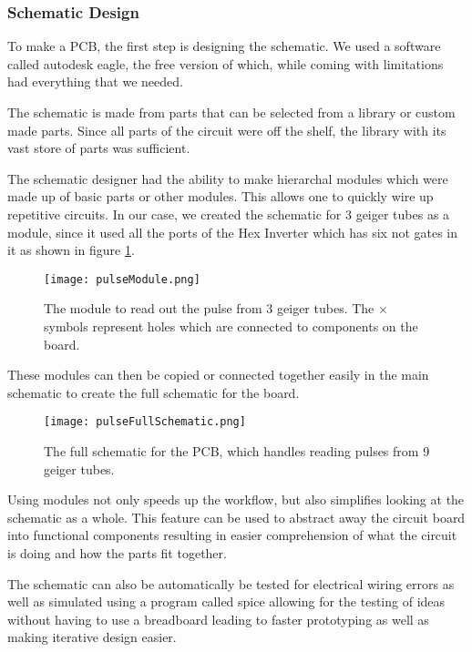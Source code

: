\documentclass[oneside]{article}
\begin{document}
      \subsubsection{Schematic Design}
        To make a PCB, the first step is designing the schematic. We used a software called autodesk eagle, the free version of which, while coming with limitations had everything that we needed.

        The schematic is made from parts that can be selected from a library or custom made parts. Since all parts of the circuit were off the shelf, the library with its vast store of parts was sufficient.

        The schematic designer had the ability to make hierarchal modules which were made up of basic parts or other modules. This allows one to quickly wire up repetitive circuits. In our case, we created the schematic for 3 geiger tubes as a module, since it used all the ports of the Hex Inverter which has six not gates in it as shown in figure \ref{pulseModule}.

        \begin{figure}[H]
            \centering
            \texttt{[image: pulseModule.png]}
            \caption{The module to read out the pulse from 3 geiger tubes. The $\times$ symbols represent holes which are connected to components on the board.}
            \label{pulseModule}
        \end{figure}

        These modules can then be copied or connected together easily in the main schematic to create the full schematic for the board.

        \begin{figure}[H]
            \centering
            \texttt{[image: pulseFullSchematic.png]}
            \caption{The full schematic for the PCB, which handles reading pulses from 9 geiger tubes.}
            \label{pulseFullSchematic}
        \end{figure}

        Using modules not only speeds up the workflow, but also simplifies looking at the schematic as a whole. This feature can be used to abstract away the circuit board into functional components resulting in easier comprehension of what the circuit is doing and how the parts fit together.

        The schematic can also be automatically be tested for electrical wiring errors as well as simulated using a program called spice allowing for the testing of ideas without having to use a breadboard leading to faster prototyping as well as making iterative design easier.
\end{document}

